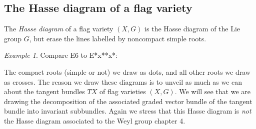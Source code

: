 \documentclass[a4paper,10pt]{amsart}
\theoremstyle{remark}
\newtheorem{example}{Example}
\begin{document}
\subsection{The Hasse diagram of a flag variety}\label{subsection:define.Hasse}
The \emph{Hasse diagram} of a flag variety \((X,G)\) is the Hasse diagram of the Lie group \(G\), but erase the lines labelled by noncompact simple roots.
\begin{example} 
Compare \dynkin E6 to \dynkin E{*x**x*}:
\end{example}
The compact roots (simple or not) we draw as dots, and all other roots we draw as crosses.
The reason we draw these diagrams is to unveil as much as we can about the tangent bundles \(TX\) of flag varieties \((X,G)\).
We will see that we are drawing the decomposition of the associated graded vector bundle of the tangent bundle into invariant subbundles.
Again we stress that this Hasse diagram is \emph{not} the Hasse diagram associated to the Weyl group \cite{Baston/Eastwood:1989} chapter 4.
\end{document}
